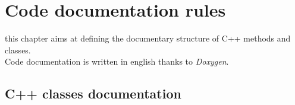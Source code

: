 \documentclass[a4paper,twoside,openright,makeidx,12pt]{report}
\begin{document}
\pagestyle{empty}
\renewcommand{\arraystretch}{1.8}



\tableofcontents
\pagestyle{fancy}










\chapter{Code documentation rules}

this chapter aims at defining the documentary structure of C++ methods and classes.\\
Code documentation is written in english thanks to \textit{Doxygen}.\\

\section{C++ classes documentation}
\end{document}
